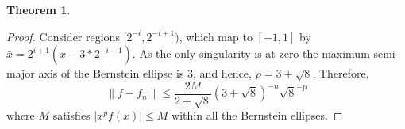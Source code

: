 \documentclass[aps]{revtex4-2}
\newtheorem{theorem}{Theorem}
\begin{document}
\begin{theorem}
    
\end{theorem}
\begin{proof}
    Consider regions $[2^{-i}, 2^{-i+1})$, which map to $[-1,1]$ by $\bar x = 2^{i+1} (x- 3*2^{-i-1})$. As the only singularity is at zero the maximum semi-major axis of the Bernstein ellipse is $3$, and hence, $\rho = 3 + \sqrt{8}$. Therefore,
    \begin{equation}
    \|f-f_n\| \leq  \frac{2M}{2 + \sqrt{8}}(3 + \sqrt{8})^{-n} \sqrt{8}^{-p}
\end{equation}
where $M$ satisfies $|x^p f(x)| \leq M$ within all the Bernstein ellipses.
\end{proof}
\end{document}
